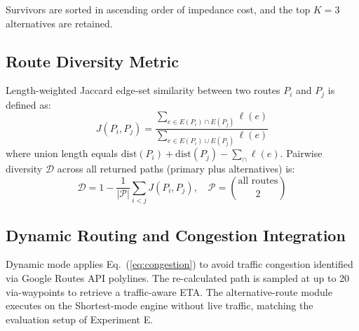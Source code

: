 \documentclass[11pt,conference]{IEEEtran}
\begin{document}
Survivors are sorted in ascending order of impedance cost, and the top $K=3$ alternatives are retained.

\subsection{Route Diversity Metric}

Length-weighted Jaccard edge-set similarity between two routes $P_i$ and $P_j$ is defined as:
\begin{equation}
  J(P_i, P_j) = \frac{\sum_{e\in E(P_i)\cap E(P_j)}\ell(e)}{\sum_{e\in E(P_i)\cup E(P_j)}\ell(e)}
  \label{eq:jaccard}
\end{equation}
where union length equals $\mathrm{dist}(P_i) + \mathrm{dist}(P_j) - \sum_\cap\ell(e)$.
Pairwise diversity $\mathcal{D}$ across all returned paths (primary plus alternatives) is:
\begin{equation}
  \mathcal{D} = 1 - \frac{1}{|\mathcal{P}|}\sum_{i < j} J(P_i, P_j), \quad \mathcal{P} = \binom{\text{all routes}}{2}
  \label{eq:diversity}
\end{equation}

\subsection{Dynamic Routing and Congestion Integration}

Dynamic mode applies Eq.~(\ref{eq:congestion}) to avoid traffic congestion identified via Google Routes API polylines.
The re-calculated path is sampled at up to 20 via-waypoints to retrieve a traffic-aware ETA.
The alternative-route module executes on the Shortest-mode engine without live traffic, matching the evaluation setup of Experiment E.
\end{document}
